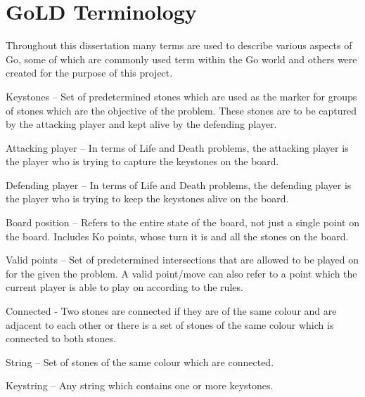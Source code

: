 \documentclass{l4proj}
\begin{document}
\section{GoLD Terminology}

Throughout this dissertation many terms are used to describe various aspects of Go, some of which are commonly used term within the Go world and others were created for the purpose of this project.

Keystones – Set of predetermined stones which are used as the marker for groups of stones which are the objective of the problem. These stones are to be captured by the attacking player and kept alive by the defending player.

Attacking player – In terms of Life and Death problems, the attacking player is the player who is trying to capture the keystones on the board.

Defending player – In terms of Life and Death problems, the defending player is the player who is trying to keep the keystones alive on the board.

Board position – Refers to the entire state of the board, not just a single point on the board. Includes Ko points, whose turn it is and all the stones on the board.

Valid points – Set of predetermined intersections that are allowed to be played on for the given the problem. A valid point/move can also refer to a point which the current player is able to play on according to the rules.

Connected - Two stones are connected if they are of the same colour and are adjacent to each other or there is a set of stones of the same colour which is connected to both stones.

String – Set of stones of the same colour which are connected.

Keystring – Any string which contains one or more keystones.
\end{document}

